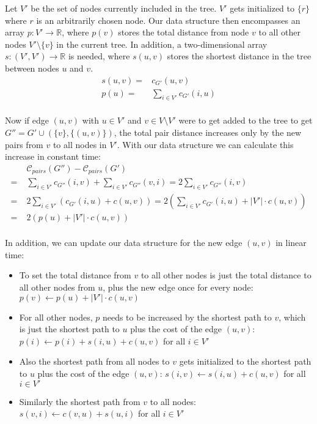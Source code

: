 \documentclass[a4paper, oneside]{discothesis}
\begin{document}
Let $V'$ be the set of nodes currently included in the tree. $V'$ gets initialized to $\{r\}$ where $r$ is an arbitrarily chosen node. Our data structure then encompasses an array $p:V'\to\mathbb{R}$, where $p(v)$ stores the total distance from node $v$ to all other nodes $V'\setminus\{v\}$ in the current tree. In addition, a two-dimensional array $s:(V',V')\to\mathbb{R}$ is needed, where $s(u,v)$ stores the shortest distance in the tree between nodes $u$ and $v$.
\begin{equation}
\begin{split}
s(u,v)=&c_{G'}(u,v)\\
p(u)=&\sum_{i\in V'}c_{G'}(i,u) \\
\end{split}
\end{equation}

Now if edge $(u,v)$ with $u\in V'$ and $v\in V\setminus V'$ were to get added to the tree to get $G''=G'\cup(\{v\}, \{(u,v)\})$, the total pair distance increases only by the new pairs from $v$ to all nodes in $V'$. With our data structure we can calculate this increase in constant time:
\begin{equation}
\begin{split}
& \mathcal{C}_{pairs}(G'')-\mathcal{C}_{pairs}(G') \\
=\;&\sum_{i\in V'}c_{G''}(i, v)+\sum_{i\in V'}c_{G''}(v, i)=2\sum_{i\in V'}c_{G''}(i, v) \\
=\;&2\sum_{i\in V'}\left(c_{G'}(i,u)+c(u,v)\right)=2\left(\sum_{i\in V'}c_{G'}(i,u)+|V'|\cdot c(u,v)\right) \\
=\;&2\left(p(u)+|V'|\cdot c(u,v)\right) \\
\end{split}
\end{equation}

In addition, we can update our data structure for the new edge $(u,v)$ in linear time:
\begin{itemize}
\item To set the total distance from $v$ to all other nodes is just the total distance to all other nodes from $u$, plus the new edge once for every node: $p(v)\gets p(u)+|V'|\cdot c(u,v)$
\item For all other nodes, $p$ needs to be increased by the shortest path to $v$, which is just the shortest path to $u$ plus the cost of the edge $(u,v)$: $p(i)\gets p(i)+s(i,u)+c(u,v)$ for all $i\in V'$
\item Also the shortest path from all nodes to $v$ gets initialized to the shortest path to $u$ plus the cost of the edge $(u,v)$: $s(i,v)\gets s(i,u)+c(u,v)$ for all $i\in V'$
\item Similarly the shortest path from $v$ to all nodes: $s(v,i)\gets c(v,u)+s(u,i)$ for all $i\in V'$
\end{itemize}
\end{document}
